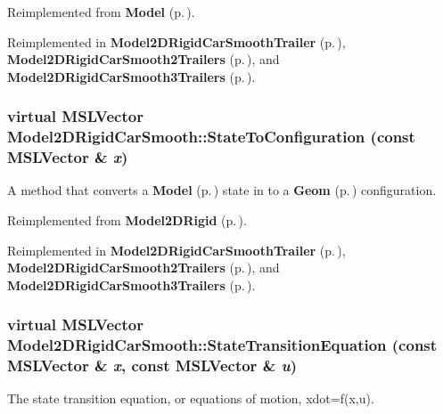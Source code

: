 Reimplemented from {\bf Model} {\rm (p.\,\pageref{class_Model_a4})}.

Reimplemented in {\bf Model2DRigid\-Car\-Smooth\-Trailer} {\rm (p.\,\pageref{class_Model2DRigidCarSmoothTrailer_a5})}, {\bf Model2DRigid\-Car\-Smooth2Trailers} {\rm (p.\,\pageref{class_Model2DRigidCarSmooth2Trailers_a5})}, and {\bf Model2DRigid\-Car\-Smooth3Trailers} {\rm (p.\,\pageref{class_Model2DRigidCarSmooth3Trailers_a5})}.
\subsubsection{\setlength{\rightskip}{0pt plus 5cm}virtual {\bf MSLVector} Model2DRigid\-Car\-Smooth::State\-To\-Configuration (const {\bf MSLVector} \& {\em x})\hspace{0.3cm}{\tt  [virtual]}}\label{class_Model2DRigidCarSmooth_a5}


A method that converts a {\bf Model} {\rm (p.\,\pageref{class_Model})} state in to a {\bf Geom} {\rm (p.\,\pageref{class_Geom})} configuration.



Reimplemented from {\bf Model2DRigid} {\rm (p.\,\pageref{class_Model2DRigid_a6})}.

Reimplemented in {\bf Model2DRigid\-Car\-Smooth\-Trailer} {\rm (p.\,\pageref{class_Model2DRigidCarSmoothTrailer_a4})}, {\bf Model2DRigid\-Car\-Smooth2Trailers} {\rm (p.\,\pageref{class_Model2DRigidCarSmooth2Trailers_a4})}, and {\bf Model2DRigid\-Car\-Smooth3Trailers} {\rm (p.\,\pageref{class_Model2DRigidCarSmooth3Trailers_a4})}.
\subsubsection{\setlength{\rightskip}{0pt plus 5cm}virtual {\bf MSLVector} Model2DRigid\-Car\-Smooth::State\-Transition\-Equation (const {\bf MSLVector} \& {\em x}, const {\bf MSLVector} \& {\em u})\hspace{0.3cm}{\tt  [virtual]}}\label{class_Model2DRigidCarSmooth_a2}


The state transition equation, or equations of motion, xdot=f(x,u).



